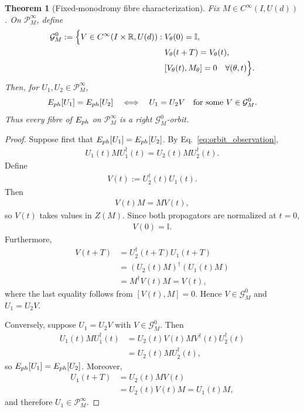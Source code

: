 \documentclass[10pt,a4paper]{amsart}
\newtheorem{theorem}{Theorem}
\begin{document}
\begin{theorem}[Fixed-monodromy fibre characterization]
Fix $M\in C^\infty(I,U(d))$. On $\mathcal P_M^\infty$, define
\begin{align}
\mathcal G_M^0
:=
\Bigl\{
V\in C^\infty(I\times\mathbb R,U(d)):
&\;V_\theta(0)=\mathbb I,
\nonumber\\
&\;V_\theta(t+T)=V_\theta(t),
\nonumber\\
&\;[V_\theta(t),M_\theta]=0
\quad\forall(\theta,t)
\Bigr\}.
\label{eq:G_M}
\end{align}
Then, for $U_1,U_2\in\mathcal P_M^\infty$,
\begin{align}
E_{\rm ph}[U_1]=E_{\rm ph}[U_2]
\quad\Longleftrightarrow\quad
U_1=U_2V
\quad\text{for some }V\in\mathcal G_M^0.
\label{eq:fibre_characterization}
\end{align}
Thus every fibre of $E_{\rm ph}$ on $\mathcal P_M^\infty$ is a right $\mathcal G_M^0$-orbit.
\end{theorem}

\begin{proof}
Suppose first that
$E_{\rm ph}[U_1]=E_{\rm ph}[U_2]$. By Eq.~\eqref{eq:orbit_observation},
\begin{align}
U_1(t)MU_1^\dagger(t)
=
U_2(t)MU_2^\dagger(t).
\end{align}
Define
\begin{align}
V(t):=U_2^\dagger(t)U_1(t).
\end{align}
Then
\begin{align}
V(t)M
=
MV(t),
\end{align}
so $V(t)$ takes values in $Z(M)$. Since both propagators are normalized at $t=0$,
\begin{align}
V(0)=\mathbb I.
\end{align}
Furthermore,
\begin{align}
V(t+T)
&=
U_2^\dagger(t+T)U_1(t+T)
\nonumber\\
&=
(U_2(t)M)^\dagger(U_1(t)M)
\nonumber\\
&=
M^\dagger V(t)M
=
V(t),
\end{align}
where the last equality follows from $[V(t),M]=0$. Hence $V\in\mathcal G_M^0$ and $U_1=U_2V$.

Conversely, suppose $U_1=U_2V$ with $V\in\mathcal G_M^0$. Then
\begin{align}
U_1(t)MU_1^\dagger(t)
&=
U_2(t)V(t)MV^\dagger(t)U_2^\dagger(t)
\nonumber\\
&=
U_2(t)MU_2^\dagger(t),
\end{align}
so $E_{\rm ph}[U_1]=E_{\rm ph}[U_2]$. Moreover,
\begin{align}
U_1(t+T)
&=
U_2(t)MV(t)
\nonumber\\
&=
U_2(t)V(t)M
=
U_1(t)M,
\end{align}
and therefore $U_1\in\mathcal P_M^\infty$.
\end{proof}
\end{document}
